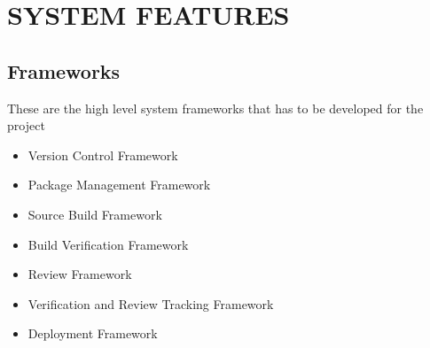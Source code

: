 \documentclass[12pt,a4paper,oneside]{report}
\begin{document}
\chapter{SYSTEM FEATURES}
\section{Frameworks}
\par



These are the high level system frameworks that has to be developed for the project
\begin{itemize}

\item  Version Control Framework
\item  Package Management Framework
\item  Source Build Framework
\item  Build Verification Framework
\item  Review Framework
\item  Verification and Review Tracking Framework
\item  Deployment Framework

\end{itemize}
\end{document}
